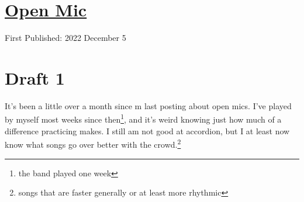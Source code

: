\documentclass[12pt]{article}[titlepage]
\newcommand{\1}{\={a}}
\newcommand{\2}{\={e}}
\newcommand{\3}{\={\i}}
\newcommand{\4}{\=o}
\newcommand{\5}{\=u}
\newcommand{\6}{\={A}}
\renewcommand{\,}{\textsuperscript{,}}
\begin{document}
\doublespacing
\section{\href{open-mic-4.html}{Open Mic}}
First Published: 2022 December 5

\section{Draft 1}
It's been a little over a month since m last posting about open mics.
I've played by myself most weeks since then\footnote{the band played one week}, and it's weird knowing just how much of a difference practicing makes.
I still am not good at accordion, but I at least now know what songs go over better with the crowd.\footnote{songs that are faster generally or at least more rhythmic}
\end{document}
